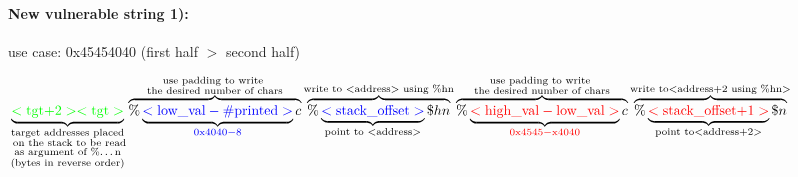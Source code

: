 \documentclass{article}
\begin{document}
\paragraph{New vulnerable string 1):} use case: 0x\color{red}4545\color{blue}4040 \color{black}(\color{red}first half \color{black} $>$ \color{blue} second half\color{black})\\
\begin{adjustwidth}{-3cm}{-3cm}
\centering
$\underbrace{
	\color{green}<\text{tgt+2}>
	<\text{tgt}>
}_{\substack{\text{target addresses placed}\\\text{ on the stack to be read}\\\text{as argument of \%\dots n}\\\text{(bytes in reverse order)}}}
\overbrace{
	\color{black}\%
	\underbrace{
		\color{blue} <\text{low}\_\text{val}-\text{\#printed}>
	}_{
		\color{blue} 0\text{x}4040 - 8\color{black}
	}
	\color{black} c
}^{
	\substack{
		\text{use padding to write }\\
		\text{the desired number of chars}
	}
}
\overbrace{
	\%
	\underbrace{
		\color{blue} <\text{stack}\_
		\text{offset}>
	}_{\text{point to \color{red}}<
	\text{address}>}
	\color{black} \$hn
}^{
	\text{write to }<\text{address}>\text{ using \%hn}
}
\overbrace{
	\color{black} \% 
	\underbrace{
		\color{red} <\text{high}\_\text{val}-\text{low}\_\text{val}>
	}_{
		\color{red} 0\text{x}4545-\text{x}4040
	} 
	\color{black} c
}^{
	\substack{
		\text{use padding to write }\\
		\text{the desired number of chars}
	}
}
\overbrace{
	\color{black} \%
	\underbrace{
		\color{red} <\text{stack}\_\text{offset+1}>
	}_{
		\text{point to}<\text{address+2}>
	}
	\color{black} \$n
}^{
	\text{write to}<\text{address+2 using \%hn}>
}
$
\end{adjustwidth}
\end{document}
